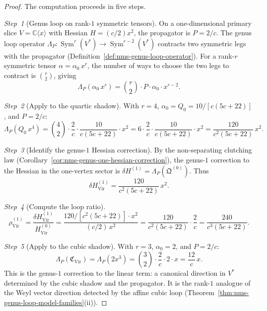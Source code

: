 \begin{proof}
The computation proceeds in five steps.

\emph{Step~1} (Genus loop on rank-$1$ symmetric tensors).
On a one-dimensional primary slice $V = \mathbb C\langle x\rangle$
with Hessian $H = (c/2)x^2$, the propagator is $P = 2/c$.
The genus loop operator
$\Lambda_P \colon \operatorname{Sym}^r(V^*) \to
\operatorname{Sym}^{r-2}(V^*)$
contracts two symmetric legs with the propagator
(Definition~\ref{def:nms-genus-loop-operator}).  For a
rank-$r$ symmetric tensor $\alpha = \alpha_0\,x^r$, the
number of ways to choose the two legs to contract is
$\binom{r}{2}$, giving
\begin{equation}
\label{eq:w-genus-loop-rank1-formula}
\Lambda_P(\alpha_0\,x^r)
= \binom{r}{2} \cdot P \cdot \alpha_0 \cdot x^{r-2}.
\end{equation}

\emph{Step~2} (Apply to the quartic shadow).
With $r = 4$, $\alpha_0 = Q_0 = 10/[c(5c+22)]$, and
$P = 2/c$:
\[
\Lambda_P(Q_0\,x^4)
= \binom{4}{2} \cdot \frac{2}{c} \cdot
\frac{10}{c(5c+22)} \cdot x^2
= 6 \cdot \frac{2}{c} \cdot
\frac{10}{c(5c+22)} \cdot x^2
= \frac{120}{c^2(5c+22)}\,x^2.
\]

\emph{Step~3} (Identify the genus-$1$ Hessian correction).
By the non-separating clutching law
(Corollary~\ref{cor:nms-genus-one-hessian-correction}),
the genus-$1$ correction to the Hessian in the one-vertex
sector is $\delta H^{(1)} = \Lambda_P(\mathfrak Q^{(0)})$.
Thus
\[
\delta H^{(1)}_{\mathrm{Vir}}
= \frac{120}{c^2(5c+22)}\,x^2.
\]

\emph{Step~4} (Compute the loop ratio).
\[
\rho^{(1)}_{\mathrm{Vir}}
= \frac{\delta H^{(1)}_{\mathrm{Vir}}}{H^{(0)}_{\mathrm{Vir}}}
= \frac{120/[c^2(5c+22)] \cdot x^2}{(c/2)\,x^2}
= \frac{120}{c^2(5c+22)} \cdot \frac{2}{c}
= \frac{240}{c^3(5c+22)}.
\]

\emph{Step~5} (Apply to the cubic shadow).
With $r = 3$, $\alpha_0 = 2$, and $P = 2/c$:
\begin{equation}
\label{eq:w-virasoro-cubic-loop-computation}
\Lambda_P(\mathfrak C_{\mathrm{Vir}})
= \Lambda_P(2x^3)
= \binom{3}{2} \cdot \frac{2}{c} \cdot 2 \cdot x
= \frac{12}{c}\,x.
\end{equation}
This is the genus-$1$ correction to the linear term: a canonical
direction in $V^*$ determined by the cubic shadow and the
propagator.  It is the rank-$1$ analogue of the Weyl vector
direction detected by the affine cubic loop
(Theorem~\ref{thm:nms-genus-loop-model-families}(ii)).\qedhere
\end{proof}

